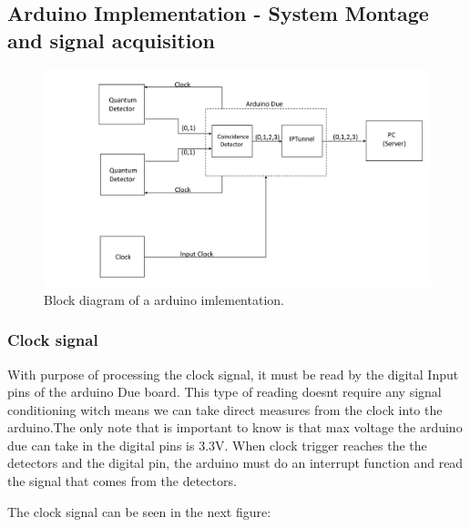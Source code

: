 \begin{refsection}
\begin{itemize}
	\end{itemize}
	
	
	\subsection{Arduino Implementation - System Montage and signal acquisition}
	
	\begin{figure}[H]
		\centering
		\includegraphics[width=1.1\linewidth]{./sdf/arduino_quantum_rx/figures/DiagramaGeralArduino.pdf}
		\caption{Block diagram of a arduino imlementation.}
		\label{fig:netxpto}
	\end{figure}
	
	
	\vspace{15px}
	\subsubsection{Clock signal}
	
	With purpose of processing the clock signal, it must be read by the digital Input pins of the arduino Due board. This type of reading doesnt require any signal conditioning witch means we can take direct measures from the clock into the arduino.The only note that is important to know is that max voltage the arduino due can take in the digital pins is 3.3V. When clock trigger reaches the the detectors and the digital pin, the arduino must do an interrupt function and read the signal that comes from the detectors.
	\vspace{15px}
	
   The clock signal can be seen in the next figure:
	

\end{refsection}
